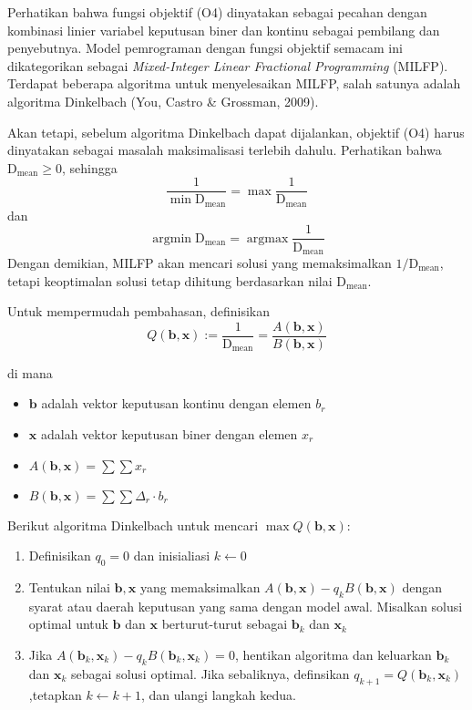 Perhatikan bahwa fungsi objektif (O4) dinyatakan sebagai pecahan dengan kombinasi linier variabel keputusan biner dan kontinu sebagai pembilang dan penyebutnya. Model pemrograman dengan fungsi objektif semacam ini dikategorikan sebagai \textit{Mixed-Integer Linear Fractional Programming} (MILFP). Terdapat beberapa algoritma untuk menyelesaikan MILFP, salah satunya adalah algoritma Dinkelbach (You, Castro & Grossman, 2009).  

Akan tetapi, sebelum algoritma Dinkelbach dapat dijalankan, objektif (O4) harus dinyatakan sebagai masalah maksimalisasi terlebih dahulu. Perhatikan bahwa $\text{D}_\text{mean} \geq 0$, sehingga 
\begin{equation*}
  \frac{1}{\min \text{D}_\text{mean}}=\max\frac{1}{\text{D}_\text{mean}}
\end{equation*} 
dan 
\begin{equation*}
  \operatorname{argmin}\text{D}_\text{mean}=\operatorname{argmax}\frac{1}{\text{D}_\text{mean}}
\end{equation*} 
Dengan demikian, MILFP akan mencari solusi yang memaksimalkan ${1}/{\text{D}_\text{mean}}$, tetapi keoptimalan solusi tetap dihitung berdasarkan nilai ${\text{D}_\text{mean}}$.

Untuk mempermudah pembahasan, definisikan
\begin{equation*}
Q(\mathbf{b},\mathbf{x}):=\frac{1}{\text{D}_\text{mean}}=\frac{A(\mathbf{b}, \mathbf{x})}{B(\mathbf{b}, \mathbf{x})}
\end{equation*}

di mana
\begin{itemize}
  \item{$\mathbf{b}$ adalah vektor keputusan kontinu dengan elemen $b_r$}
  \item{$\mathbf{x}$ adalah vektor keputusan biner dengan elemen $x_r$}
  \item{$A(\mathbf{b}, \mathbf{x})=\sum\sum x_r$}
  \item{$B(\mathbf{b}, \mathbf{x})=\sum\sum \Delta_r\cdot b_r$}
\end{itemize}

Berikut algoritma Dinkelbach untuk mencari $\max Q(\mathbf{b},\mathbf{x})$:
\begin{enumerate}
  \item{Definisikan $q_0=0$ dan inisialiasi $k \gets 0$}
  \item{Tentukan nilai $\mathbf{b},\mathbf{x}$ yang memaksimalkan $A(\mathbf{b},\mathbf{x})-q_kB(\mathbf{b},\mathbf{x})$ dengan syarat atau daerah keputusan yang sama dengan model awal. Misalkan solusi optimal untuk $\mathbf{b}$ dan $\mathbf{x}$ berturut-turut sebagai $\mathbf{b}_k$ dan $\mathbf{x}_k$} 
  \item{Jika $A(\mathbf{b}_k,\mathbf{x}_k)-q_kB(\mathbf{b}_k,\mathbf{x}_k)=0$, hentikan algoritma dan keluarkan $\mathbf{b}_k$ dan $\mathbf{x}_k$ sebagai solusi optimal. Jika sebaliknya, definsikan $q_{k+1}=Q(\mathbf{b}_k,\mathbf{x}_k)$,tetapkan $k \gets k+1$, dan ulangi langkah kedua.}
\end{enumerate}


